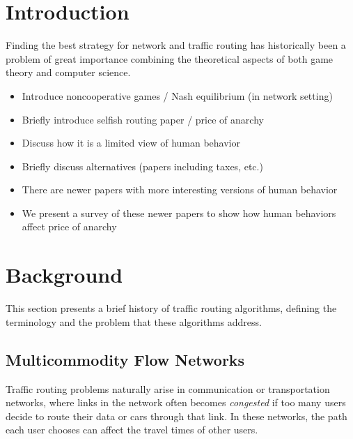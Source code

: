 \documentclass[acmlarge]{acmart}
\begin{document}
\section{Introduction}
Finding the best strategy for network and traffic routing has historically been a problem of great importance combining the theoretical aspects of both game theory and computer science. 
\begin{itemize}
    \item Introduce noncooperative games / Nash equilibrium (in network setting)
    \item Briefly introduce selfish routing paper / price of anarchy
    \item Discuss how it is a limited view of human behavior
    \item Briefly discuss alternatives (papers including taxes, etc.)
    \item There are newer papers with more interesting versions of human behavior
    \item We present a survey of these newer papers to show how human behaviors affect price of anarchy
\end{itemize}

\section{Background}
This section presents a brief history of traffic routing algorithms, defining the terminology
and the problem that these algorithms address.

\subsection{Multicommodity Flow Networks}
Traffic routing problems naturally arise in communication or transportation networks, where
links in the network often becomes \emph{congested} if too many users decide to route their data 
or cars through that link. In these networks, the path each user chooses can affect the travel times of other
users.
\end{document}
